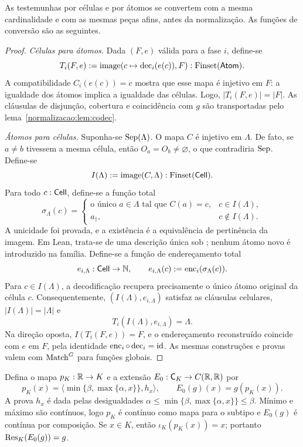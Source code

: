 \begin{lema}\label{map:normalizacao:5.4}\label{normalizacao:lem:witnesses}
As testemunhas por células e por átomos se convertem com a mesma
cardinalidade e com as mesmas peças afins, antes da normalização.
As funções de conversão são as seguintes.
\end{lema}
\begin{proof}
\emph{Células para átomos.} Dada $(F,e)$ válida para a fase $i$,
define-se
\[
 T_i(F,e):=\operatorname{image}
             (c\mapsto\operatorname{dec}_i(e(c)),F):\operatorname{Finset}(\mathsf{Atom}).
\]
A compatibilidade $C_i(e(c))=c$ mostra que esse mapa é injetivo em
$F$: a igualdade dos átomos implica a igualdade das células.
Logo, $|T_i(F,e)|=|F|$. As cláusulas de disjunção, cobertura e
coincidência com $g$ são transportadas pelo lema~\ref{normalizacao:lem:codec}.

\emph{Átomos para células.} Suponha-se $\operatorname{Sep}(\Lambda)$. O mapa
$C$ é injetivo em $\Lambda$. De fato, se $a\ne b$ tivessem a
mesma célula, então $O_a=O_b\ne\varnothing$, o que contradiria
$\operatorname{Sep}$. Define-se
\[
 I(\Lambda):=\operatorname{image}(C,\Lambda):\operatorname{Finset}(\mathsf{Cell}).
\]
Para todo $c:\mathsf{Cell}$, define-se a função total
\[
 \sigma_\Lambda(c)=
 \begin{cases}
 \text{o único }a\in\Lambda\text{ tal que }C(a)=c,
                                      &c\in I(\Lambda),\\
 a_\dagger,                            &c\notin I(\Lambda).
 \end{cases}
\]
A unicidade foi provada, e a existência é a equivalência de
pertinência da imagem. Em Lean, trata-se de uma descrição única sob
; nenhum átomo novo é introduzido na família.
Define-se a função de endereçamento total
\[
 e_{i,\Lambda}:\mathsf{Cell}\to\mathbb N,\qquad
 e_{i,\Lambda}(c):=\operatorname{enc}_i(\sigma_\Lambda(c)).
\]
Para $c\in I(\Lambda)$, a decodificação recupera precisamente o
único átomo original da célula $c$. Consequentemente,
$(I(\Lambda),e_{i,\Lambda})$ satisfaz as cláusulas celulares,
$|I(\Lambda)|=|\Lambda|$ e
\[
 T_i(I(\Lambda),e_{i,\Lambda})=\Lambda.
\]
Na direção oposta, $I(T_i(F,e))=F$, e o endereçamento reconstruído
coincide com $e$ em $F$, pela identidade $\operatorname{enc}_i\circ\operatorname{dec}_i=\mathrm{id}$.
As mesmas construções e provas valem com $\operatorname{Match}^G$ para funções globais.
\end{proof}

\begin{definicao}\label{map:normalizacao:5.5}\label{normalizacao:def:clamp}
Defina o mapa $p_K:\mathbb R\to K$ e a extensão $E_0:\mathsf C_K\to C(\mathbb R,\mathbb R)$ por
\[
 p_K(x)=\langle\min\{\beta,\max\{\alpha,x\}\},h_x\rangle,
 \qquad E_0(g)(x)=g(p_K(x)).
\]
A prova $h_x$ é dada pelas desigualdades
$\alpha\le\min\{\beta,\max\{\alpha,x\}\}\le\beta$.
Mínimo e máximo são contínuos, logo $p_K$ é contínuo como mapa
para o subtipo e $E_0(g)$ é contínua por composição.
Se $x\in K$, então $\iota_K(p_K(x))=x$; portanto
$\operatorname{Res}_K(E_0(g))=g$.
\end{definicao}

